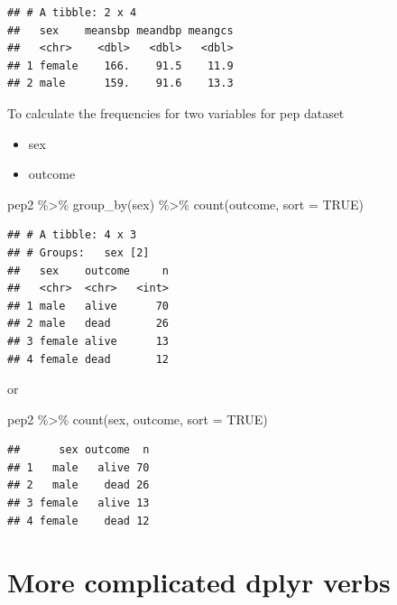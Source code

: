 \documentclass[
  10pt,
]{krantz}
\newenvironment{Shaded}{\begin{snugshade}}{\end{snugshade}}
\newcommand{\AttributeTok}[1]{\textcolor[rgb]{0.77,0.63,0.00}{#1}}
\newcommand{\ConstantTok}[1]{\textcolor[rgb]{0.00,0.00,0.00}{#1}}
\newcommand{\FunctionTok}[1]{\textcolor[rgb]{0.00,0.00,0.00}{#1}}
\newcommand{\NormalTok}[1]{#1}
\newcommand{\SpecialCharTok}[1]{\textcolor[rgb]{0.00,0.00,0.00}{#1}}
\providecommand{\tightlist}{%
  \setlength{\itemsep}{0pt}\setlength{\parskip}{0pt}}
\begin{document}
\begin{verbatim}
## # A tibble: 2 x 4
##   sex    meansbp meandbp meangcs
##   <chr>    <dbl>   <dbl>   <dbl>
## 1 female    166.    91.5    11.9
## 2 male      159.    91.6    13.3
\end{verbatim}

To calculate the frequencies for two variables for pep dataset

\begin{itemize}
\tightlist
\item
  sex
\item
  outcome
\end{itemize}

\begin{Shaded}
\begin{Highlighting}[]
\NormalTok{pep2 }\SpecialCharTok{\%\textgreater{}\%} \FunctionTok{group\_by}\NormalTok{(sex) }\SpecialCharTok{\%\textgreater{}\%}
  \FunctionTok{count}\NormalTok{(outcome, }\AttributeTok{sort =} \ConstantTok{TRUE}\NormalTok{)}
\end{Highlighting}
\end{Shaded}

\begin{verbatim}
## # A tibble: 4 x 3
## # Groups:   sex [2]
##   sex    outcome     n
##   <chr>  <chr>   <int>
## 1 male   alive      70
## 2 male   dead       26
## 3 female alive      13
## 4 female dead       12
\end{verbatim}

or

\begin{Shaded}
\begin{Highlighting}[]
\NormalTok{pep2 }\SpecialCharTok{\%\textgreater{}\%} \FunctionTok{count}\NormalTok{(sex, outcome, }\AttributeTok{sort =} \ConstantTok{TRUE}\NormalTok{)}
\end{Highlighting}
\end{Shaded}

\begin{verbatim}
##      sex outcome  n
## 1   male   alive 70
## 2   male    dead 26
## 3 female   alive 13
## 4 female    dead 12
\end{verbatim}

\hypertarget{more-complicated-dplyr-verbs}{%
\section{\texorpdfstring{More complicated \textbf{dplyr} verbs}{More complicated dplyr verbs}}\label{more-complicated-dplyr-verbs}}
\end{document}
